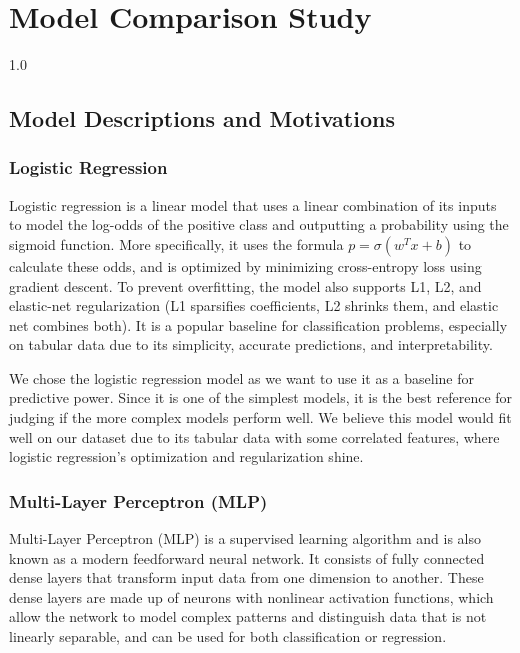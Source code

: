 \chapter{Model Comparison Study}
\begin{spacing}{1.0}
\small

\section{Model Descriptions and Motivations}

\subsection{Logistic Regression}

Logistic regression is a linear model that uses a linear combination of its inputs to model the log-odds of the positive class and outputting a probability using the sigmoid function. More specifically, it uses the formula $p = \sigma(w^T x + b)$ to calculate these odds, and is optimized by minimizing cross-entropy loss using gradient descent. To prevent overfitting, the model also supports L1, L2, and elastic-net regularization (L1 sparsifies coefficients, L2 shrinks them, and elastic net combines both). It is a popular baseline for classification problems, especially on tabular data due to its simplicity, accurate predictions, and interpretability. 

We chose the logistic regression model as we want to use it as a baseline for predictive power. Since it is one of the simplest models, it is the best reference for judging if the more complex models perform well. We believe this model would fit well on our dataset due to its tabular data with some correlated features, where logistic regression's optimization and regularization shine.
\subsection{Multi-Layer Perceptron (MLP)}

Multi-Layer Perceptron (MLP) is a supervised learning algorithm and is also known as a modern feedforward neural network. It consists of fully connected dense layers that transform input data from one dimension to another. These dense layers are made up of neurons with nonlinear activation functions, which allow the network to model complex patterns and distinguish data that is not linearly separable, and can be used for both classification or regression.


\end{spacing}
